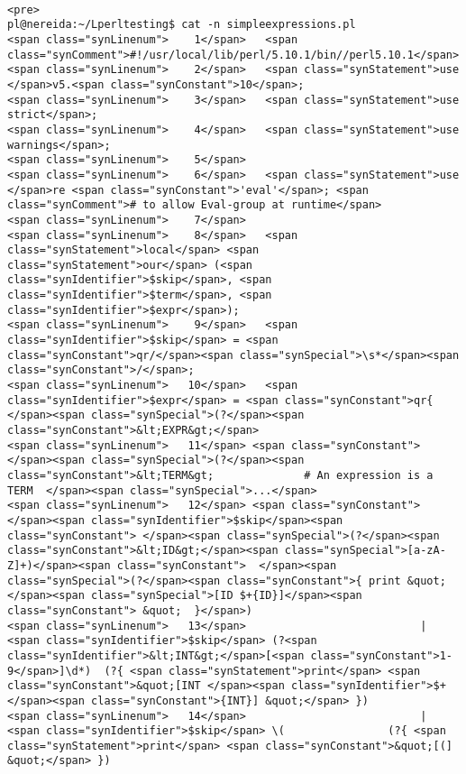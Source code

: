\begin{verbatim}

<pre>
pl@nereida:~/Lperltesting$ cat -n simpleexpressions.pl
<span class="synLinenum">    1</span>   <span class="synComment">#!/usr/local/lib/perl/5.10.1/bin//perl5.10.1</span>
<span class="synLinenum">    2</span>   <span class="synStatement">use </span>v5.<span class="synConstant">10</span>;
<span class="synLinenum">    3</span>   <span class="synStatement">use strict</span>;
<span class="synLinenum">    4</span>   <span class="synStatement">use warnings</span>;
<span class="synLinenum">    5</span> 
<span class="synLinenum">    6</span>   <span class="synStatement">use </span>re <span class="synConstant">'eval'</span>; <span class="synComment"># to allow Eval-group at runtime</span>
<span class="synLinenum">    7</span> 
<span class="synLinenum">    8</span>   <span class="synStatement">local</span> <span class="synStatement">our</span> (<span class="synIdentifier">$skip</span>, <span class="synIdentifier">$term</span>, <span class="synIdentifier">$expr</span>);
<span class="synLinenum">    9</span>   <span class="synIdentifier">$skip</span> = <span class="synConstant">qr/</span><span class="synSpecial">\s*</span><span class="synConstant">/</span>;
<span class="synLinenum">   10</span>   <span class="synIdentifier">$expr</span> = <span class="synConstant">qr{ </span><span class="synSpecial">(?</span><span class="synConstant">&lt;EXPR&gt;</span>
<span class="synLinenum">   11</span> <span class="synConstant">                     </span><span class="synSpecial">(?</span><span class="synConstant">&lt;TERM&gt;              # An expression is a TERM  </span><span class="synSpecial">...</span>
<span class="synLinenum">   12</span> <span class="synConstant">                            </span><span class="synIdentifier">$skip</span><span class="synConstant"> </span><span class="synSpecial">(?</span><span class="synConstant">&lt;ID&gt;</span><span class="synSpecial">[a-zA-Z]+)</span><span class="synConstant">  </span><span class="synSpecial">(?</span><span class="synConstant">{ print &quot;</span><span class="synSpecial">[ID $+{ID}]</span><span class="synConstant"> &quot;  }</span>)
<span class="synLinenum">   13</span>                           | <span class="synIdentifier">$skip</span> (?<span class="synIdentifier">&lt;INT&gt;</span>[<span class="synConstant">1-9</span>]\d*)  (?{ <span class="synStatement">print</span> <span class="synConstant">&quot;[INT </span><span class="synIdentifier">$+</span><span class="synConstant">{INT}] &quot;</span> })
<span class="synLinenum">   14</span>                           | <span class="synIdentifier">$skip</span> \(                (?{ <span class="synStatement">print</span> <span class="synConstant">&quot;[(] &quot;</span> })

\end{verbatim}

